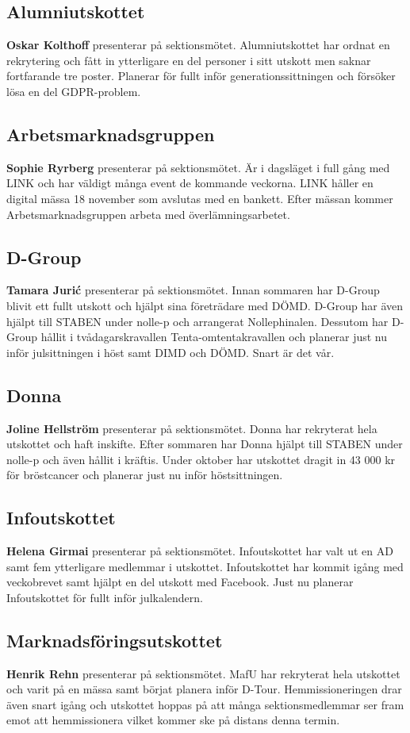 \documentclass[../protokoll_hostmote_2021.tex]{subfiles}
\begin{document}
\subsection{Alumniutskottet}
\textbf{Oskar Kolthoff} presenterar på sektionsmötet.
Alumniutskottet har ordnat en rekrytering och fått in ytterligare en del personer i sitt utskott men saknar fortfarande tre poster. Planerar för fullt inför generationssittningen och försöker lösa en del GDPR-problem. 
\subsection{Arbetsmarknadsgruppen}
\textbf{Sophie Ryrberg} presenterar på sektionsmötet.
Är i dagsläget i full gång med LINK och har väldigt många event de kommande veckorna. LINK håller en digital mässa 18 november som avslutas med en bankett. Efter mässan kommer Arbetsmarknadsgruppen arbeta med överlämningsarbetet.
\subsection{D-Group}
\textbf{Tamara Jurić} presenterar på sektionsmötet.
Innan sommaren har D-Group blivit ett fullt utskott och hjälpt sina företrädare med DÖMD. D-Group har även hjälpt till STABEN under nolle-p och arrangerat Nollephinalen. Dessutom har D-Group hållit i tvådagarskravallen Tenta-omtentakravallen och planerar just nu inför julsittningen i höst samt DIMD och DÖMD. Snart är det vår.
\subsection{Donna}
\textbf{Joline Hellström} presenterar på sektionsmötet.
Donna har rekryterat hela utskottet och haft inskifte. Efter sommaren har Donna hjälpt till STABEN under nolle-p och även hållit i kräftis. Under oktober har utskottet dragit in 43 000 kr för bröstcancer och planerar just nu inför höstsittningen.
\subsection{Infoutskottet}
\textbf{Helena Girmai} presenterar på sektionsmötet.
Infoutskottet har valt ut en AD samt fem ytterligare medlemmar i utskottet. Infoutskottet har kommit igång med veckobrevet samt hjälpt en del utskott med Facebook. Just nu planerar Infoutskottet för fullt inför julkalendern.
\subsection{Marknadsföringsutskottet}
\textbf{Henrik Rehn} presenterar på sektionsmötet.
MafU har rekryterat hela utskottet och varit på en mässa samt börjat planera inför D-Tour. Hemmissioneringen drar även snart igång och utskottet hoppas på att många sektionsmedlemmar ser fram emot att hemmissionera vilket kommer ske på distans denna termin.
\end{document}
